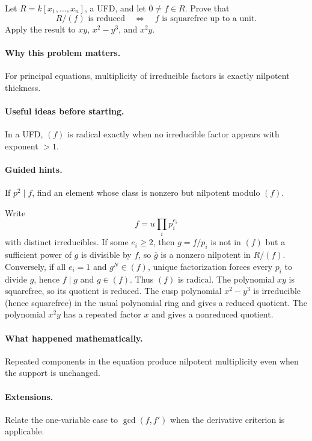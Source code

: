 \begin{problem}
Let $R=k[x_1,\dots,x_n]$, a UFD, and let $0\ne f\in R$.  Prove that
\[
R/(f)\text{ is reduced}
\quad\Longleftrightarrow\quad
f\text{ is squarefree up to a unit}.
\]
Apply the result to $xy$, $x^2-y^3$, and $x^2y$.
\end{problem}
\paragraph{Why this problem matters.}
For principal equations, multiplicity of irreducible factors is exactly nilpotent thickness.
\paragraph{Useful ideas before starting.}
In a UFD, $(f)$ is radical exactly when no irreducible factor appears with exponent $>1$.
\paragraph{Guided hints.}
If $p^2\mid f$, find an element whose class is nonzero but nilpotent modulo $(f)$.
\begin{solution}
Write
\[
f=u\prod_i p_i^{e_i}
\]
with distinct irreducibles.  If some $e_i\ge2$, then $g=f/p_i$ is not in $(f)$ but a
sufficient power of $g$ is divisible by $f$, so $\bar g$ is a nonzero nilpotent in $R/(f)$.
Conversely, if all $e_i=1$ and $g^N\in(f)$, unique factorization forces every $p_i$ to
divide $g$, hence $f\mid g$ and $g\in(f)$.  Thus $(f)$ is radical.
The polynomial $xy$ is squarefree, so its quotient is reduced.  The cusp polynomial
$x^2-y^3$ is irreducible (hence squarefree) in the usual polynomial ring and gives a
reduced quotient.  The polynomial $x^2y$ has a repeated factor $x$ and gives a nonreduced
quotient.
\end{solution}
\paragraph{What happened mathematically.}
Repeated components in the equation produce nilpotent multiplicity even when the support is
unchanged.
\paragraph{Extensions.}
Relate the one-variable case to $\gcd(f,f')$ when the derivative criterion is applicable.
